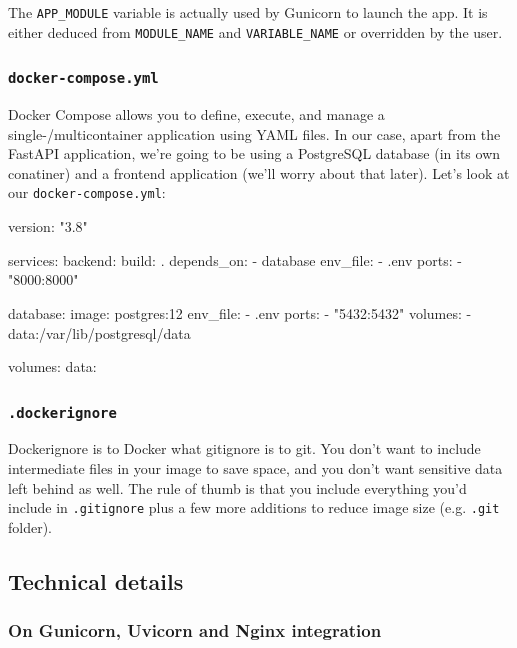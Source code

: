 \documentclass{article}
\begin{document}
The \texttt{APP\_MODULE} variable is actually used by Gunicorn to launch the app. It is either deduced from \texttt{MODULE\_NAME} and \texttt{VARIABLE\_NAME} or overridden by the user.

\subsubsection{\texttt{docker-compose.yml}\label{preparations:dockercompose}}

Docker Compose allows you to define, execute, and manage a single-/multicontainer application using YAML files. In our case, apart from the FastAPI application, we're going to be using a PostgreSQL database (in its own conatiner) and a frontend application (we'll worry about that later). Let's look at our \texttt{docker-compose.yml}:

\begin{dockercode}
version: "3.8"

services:
    backend:
        build: .
        depends_on:
            - database
        env_file:
            - .env
        ports:
            - "8000:8000"

    database:
        image: postgres:12
        env_file:
            - .env
        ports:
            - "5432:5432"
        volumes:
            - data:/var/lib/postgresql/data

volumes:
    data:
\end{dockercode}

\subsubsection{\texttt{.dockerignore}}

Dockerignore is to Docker what gitignore is to git. You don't want to include intermediate files in your image to save space, and you don't want sensitive data left behind as well. The rule of thumb is that you include everything you'd include in \texttt{.gitignore} plus a few more additions to reduce image size (e.g. \texttt{.git} folder).

\subsection{Technical details}

\subsubsection{On Gunicorn, Uvicorn and Nginx integration}
\end{document}
